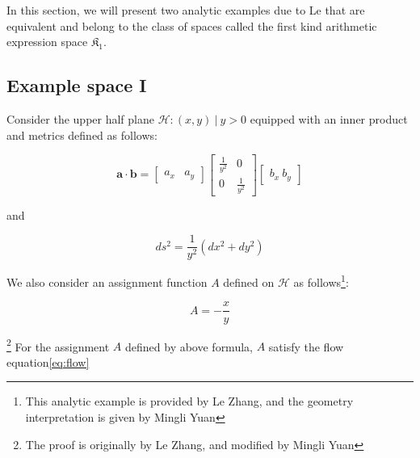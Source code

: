 
In this section, we will present two analytic examples due to Le that are equivalent and belong to the class of spaces
called the first kind arithmetic expression space $\mathfrak{K}_1$.

\subsection{Example space I}\label{subsec:exmp1}

Consider the upper half plane ${\mathcal{H}: (x, y) \ | \ y > 0}$ equipped with an inner product and metrics defined as follows:

$$
\mathbf{a} \cdot \mathbf{b} = \begin{bmatrix} a_x & a_y \end{bmatrix} \begin{bmatrix} \frac{1}{y^2} & 0 \\ 0 & \frac{1}{y^2} \end{bmatrix} \begin{bmatrix} b_x \ b_y \end{bmatrix}
$$

and

$$
ds^2 = \frac{1}{y^2} (dx^2 + dy^2)
$$

We also consider an assignment function $A$ defined on $\mathcal{H}$ as follows\footnote{This analytic example is provided by Le Zhang, and the geometry interpretation is given by Mingli Yuan}:

\begin{equation}
A = - \frac{x}{y}
\end{equation}

\begin{theorem}\footnote{The proof is originally by Le Zhang, and modified by Mingli Yuan}
For the assignment $A$ defined by above formula, $A$ satisfy the flow equation\eqref{eq:flow}
\end{theorem}

